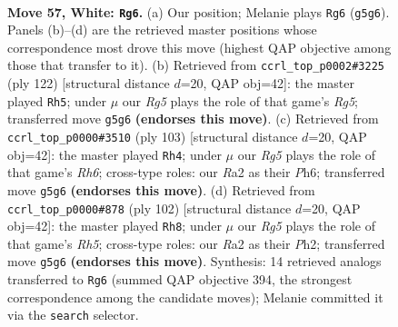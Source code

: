 \documentclass[11pt]{article}
\begin{document}
\clearpage

\begin{figure}[p]\centering
\begin{subfigure}{0.46\textwidth}\centering
\resizebox{\linewidth}{!}{%
\newchessgame
\chessboard[
  setfen={6k1/1r4b1/8/6R1/2P4K/4N3/R7/8 w - - 34 57},
  showmover=false,
  pgfstyle=straightmove, color=movearrow, markmove={g5-g6}
]}
\caption{}
\end{subfigure}\hfill
\begin{subfigure}{0.46\textwidth}\centering
\resizebox{\linewidth}{!}{%
\newchessgame
\chessboard[
  setfen={8/8/8/3kb1R1/1P6/1K6/8/r7 w - - 2 62},
  showmover=false,
  pgfstyle=straightmove, color=movearrow, markmove={g5-h5}
]}
\caption{}
\end{subfigure}
\\[4pt]
\begin{subfigure}{0.46\textwidth}\centering
\resizebox{\linewidth}{!}{%
\newchessgame
\chessboard[
  setfen={8/p7/5k1p/8/8/R3KB1r/8/8 b - - 5 52},
  showmover=false,
  pgfstyle=straightmove, color=movearrow, markmove={h3-h4}
]}
\caption{}
\end{subfigure}\hfill
\begin{subfigure}{0.46\textwidth}\centering
\resizebox{\linewidth}{!}{%
\newchessgame
\chessboard[
  setfen={8/8/8/4kb1R/1r6/5K2/7P/8 w - - 14 52},
  showmover=false,
  pgfstyle=straightmove, color=movearrow, markmove={h5-h8}
]}
\caption{}
\end{subfigure}
\caption{\textbf{Move 57, White: \texttt{Rg6}.} (a) Our position; Melanie plays \texttt{Rg6} (\texttt{g5g6}). Panels (b)--(d) are the retrieved master positions whose correspondence most drove this move (highest QAP objective among those that transfer to it). (b) Retrieved from \texttt{ccrl\_top\_p0002\#3225} (ply 122) [structural distance $d$=20, QAP obj=42]: the master played \texttt{Rh5}; under $\mu$ our \emph{Rg5} plays the role of that game's \emph{Rg5}; transferred move \texttt{g5g6} \textbf{(endorses this move)}. (c) Retrieved from \texttt{ccrl\_top\_p0000\#3510} (ply 103) [structural distance $d$=20, QAP obj=42]: the master played \texttt{Rh4}; under $\mu$ our \emph{Rg5} plays the role of that game's \emph{Rh6}; cross-type roles: our \emph{R}a2 as their \emph{P}h6; transferred move \texttt{g5g6} \textbf{(endorses this move)}. (d) Retrieved from \texttt{ccrl\_top\_p0000\#878} (ply 102) [structural distance $d$=20, QAP obj=42]: the master played \texttt{Rh8}; under $\mu$ our \emph{Rg5} plays the role of that game's \emph{Rh5}; cross-type roles: our \emph{R}a2 as their \emph{P}h2; transferred move \texttt{g5g6} \textbf{(endorses this move)}. Synthesis: 14 retrieved analogs transferred to \texttt{Rg6} (summed QAP objective 394, the strongest correspondence among the candidate moves); Melanie committed it via the \texttt{search} selector.}
\label{fig:thought-m112}
\end{figure}
\end{document}
